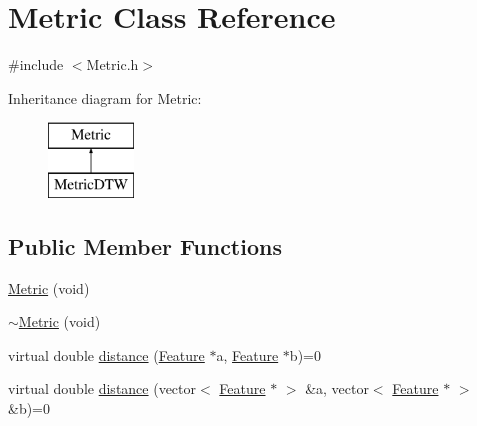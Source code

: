 \hypertarget{class_metric}{\section{Metric Class Reference}
\label{class_metric}
}


{\ttfamily \#include $<$Metric.\+h$>$}

Inheritance diagram for Metric\+:\begin{figure}[H]
\begin{center}
\leavevmode
\includegraphics[height=2.000000cm]{class_metric}
\end{center}
\end{figure}
\subsection*{Public Member Functions}
\begin{DoxyCompactItemize}
\item 
\hyperlink{class_metric_ade0443abd5c6080f406288ee650b416b}{Metric} (void)
\item 
\hyperlink{class_metric_a68ec53fa39cba9520dd20dceab1668fa}{$\sim$\+Metric} (void)
\item 
virtual double \hyperlink{class_metric_a0609682cc98cbd0a5e94df800ff18145}{distance} (\hyperlink{class_feature}{Feature} $\ast$a, \hyperlink{class_feature}{Feature} $\ast$b)=0
\item 
virtual double \hyperlink{class_metric_aeffee7c23f39f51669c4ce8cd7551cdd}{distance} (vector$<$ \hyperlink{class_feature}{Feature} $\ast$ $>$ \&a, vector$<$ \hyperlink{class_feature}{Feature} $\ast$ $>$ \&b)=0
\end{DoxyCompactItemize}


